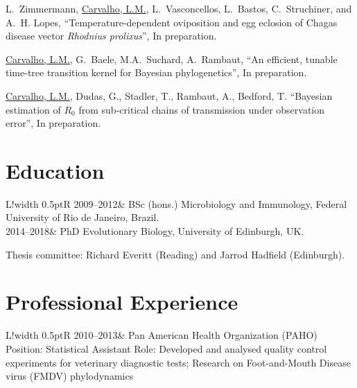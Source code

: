 \documentclass[10pt]{article}
\newcommand\VRule{\color{lightgray}\vrule width 0.5pt}
\begin{document}
L.~Zimmermann, \underline{Carvalho, L.M.}, L.~Vasconcellos, L.~Bastos, C.~Struchiner, and A.~H. Lopes, ``{T}emperature-dependent oviposition and egg eclosion of {C}hagas disease vector \textit{{R}hodnius prolixus}'', In preparation.

\underline{Carvalho, L.M.}, G.~Baele, M.A.~Suchard, A.~Rambaut, ``{A}n efficient, tunable time-tree transition kernel for Bayesian phylogenetics'', In preparation.

\underline{Carvalho, L.M.}, Dudas, G., Stadler, T., Rambaut, A., Bedford, T.  ``Bayesian estimation of $R_0$ from sub-critical chains of transmission under observation error'', In preparation.

\section*{Education}
\begin{tabular}{L!{\VRule}R}
2009--2012& BSc (hons.) Microbiology and Immunology, Federal University of Rio de Janeiro, Brazil.\\
2014--2018& PhD Evolutionary Biology, University of Edinburgh, UK.

Thesis committee: Richard Everitt (Reading) and Jarrod Hadfield (Edinburgh).
\end{tabular}

\section*{Professional Experience}
\begin{tabular}{L!{\VRule}R}
2010--2013&{
Pan American Health Organization (PAHO)\newline
Position: Statistical Assistant\newline
Role: Developed and analysed quality control experiments for veterinary diagnostic tests;\newline
Research on Foot-and-Mouth Disease virus (FMDV) phylodynamics 
}
\end{tabular}
\end{document}
